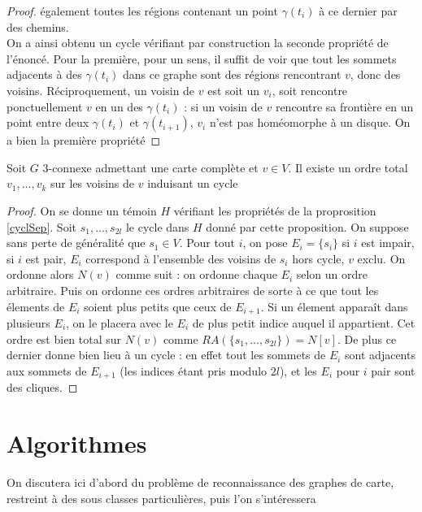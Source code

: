 \documentclass{scrartcl}
\begin{document}
\begin{flushleft}
\begin{proof}
    également toutes les régions contenant un point $\gamma(t_i)$ à ce dernier par des chemins.\\
    On a ainsi obtenu un cycle vérifiant par construction la seconde propriété de l'énoncé. Pour la première, pour un sens,
    il suffit de voir que tout les sommets adjacents à des $\gamma(t_i)$ dans ce graphe sont des régions rencontrant $v$, donc des
    voisins. Réciproquement, un voisin de $v$ est soit un $v_i$, soit rencontre ponctuellement $v$ en un des $\gamma(t_i)$ : si un
    voisin de $v$ rencontre sa frontière en un point entre deux $\gamma(t_i)$ et $\gamma(t_{i+1})$, $v_i$ n'est pas homéomorphe à
    un disque. On a bien la première propriété
\end{proof}

\begin{cor}\label{ordCycl}
    Soit $G$ $3$-connexe admettant une carte complète et $v \in V$. Il existe un ordre total $v_1, ..., v_k$ sur les voisins de $v$
    induisant un cycle
\end{cor}

\begin{proof}
    On se donne un témoin $H$ vérifiant les propriétés de la proprosition \ref{cyclSep}. Soit $s_1, ..., s_{2l}$ le cycle dans $H$
    donné par cette proposition. On suppose sans perte de généralité que $s_1 \in V$. Pour tout $i$, on pose $E_i = \{s_i\}$
    si $i$ est impair, si $i$ est pair, $E_i$ correspond à l'ensemble des voisins de $s_i$ hors cycle, $v$ exclu. On ordonne alors $N(v)$
    comme suit : on ordonne chaque $E_i$ selon un ordre arbitraire. Puis on ordonne ces ordres arbitraires de sorte à ce que
    tout les élements de $E_i$ soient plus petits que ceux de $E_{i+1}$. Si un élement apparaît dans plusieurs $E_i$, on le placera avec
    le $E_i$ de plus petit indice auquel il appartient. Cet ordre est bien total sur $N(v)$
    comme $RA(\{s_1, ..., s_{2l}\}) = N[v]$. De plus ce dernier donne bien lieu à un cycle : en effet tout les sommets de $E_i$ sont
    adjacents aux sommets de $E_{i+1}$ (les indices étant pris modulo $2l$), et les $E_i$ pour $i$ pair sont des cliques.
\end{proof}

\section{Algorithmes}

On discutera ici d'abord du problème de reconnaissance des graphes de carte, restreint à des sous classes particulières, puis l'on s'intéressera


\end{flushleft}
\end{document}
